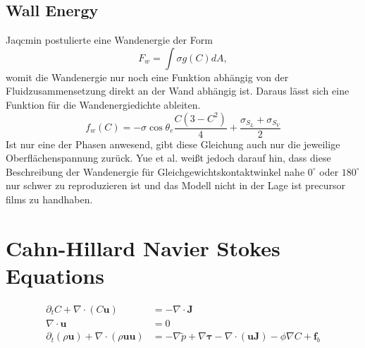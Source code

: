\subsection{Wall Energy}
Jaqcmin \cite{jacqmin1999CalculationTwoPhaseNavier} postulierte eine Wandenergie der Form
\begin{equation}
    F_w=\int \sigma g(C)dA, 
\end{equation}
womit die Wandenergie nur noch eine Funktion abhängig von der Fluidzusammensetzung direkt an der Wand abhängig ist. Daraus lässt sich eine Funktion für die Wandenergiedichte ableiten\cite{jacqmin2000ContactlineDynamicsDiffuse}.
\begin{equation}
    f_w(C)=-\sigma \cos\theta_e \frac{C(3-C^2)}{4} + \frac{\sigma_{S_L}+ \sigma_{S_V}}{2}
\end{equation}
Ist nur eine der Phasen anwesend, gibt diese Gleichung auch nur die jeweilige Oberflächenspannung zurück. Yue et al. weißt jedoch darauf hin, dass diese Beschreibung der Wandenergie für Gleichgewichtskontaktwinkel nahe $0^{\circ}$ oder $180^{\circ}$ nur schwer zu reproduzieren ist und das Modell nicht in der Lage ist precursor films zu handhaben. 



\section{Cahn-Hillard Navier Stokes Equations}

\begin{align}
    \partial_t C + \nabla \cdot \left( C \mathbf{u} \right) &= -\nabla \cdot \mathbf{J} \\
    \nabla \cdot \mathbf{u} &= 0 \\
    \partial_t(\rho \mathbf{u}) + \nabla \cdot (\rho \mathbf{u}\mathbf{u})&= -\nabla \tilde{p} + \nabla \mathbf{\tau} - \nabla \cdot(\mathbf{u}\mathbf{J})-\phi\nabla C + \mathbf{f}_b 
\end{align}